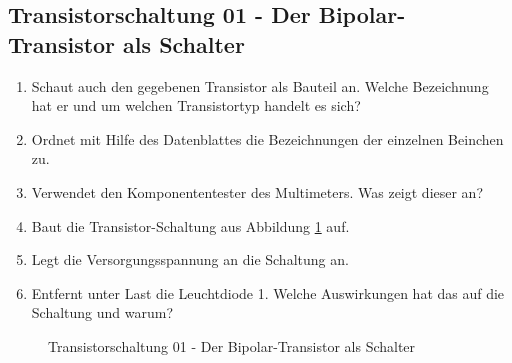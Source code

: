 \subsection*{Transistorschaltung 01 - Der Bipolar-Transistor als Schalter}

\begin{enumerate}
\itemsep1pt\parskip0pt
\item Schaut auch den gegebenen Transistor als Bauteil an. Welche Bezeichnung
  hat er und um welchen Transistortyp handelt es sich? 
\item Ordnet mit Hilfe des Datenblattes die Bezeichnungen der einzelnen Beinchen
  zu. 
\item Verwendet den Komponententester des Multimeters. Was zeigt dieser an?
\item Baut die Transistor-Schaltung aus Abbildung \ref{s01} auf.
\item Legt die Versorgungsspannung an die Schaltung an.
\item Entfernt unter Last die Leuchtdiode 1. Welche Auswirkungen hat das auf die Schaltung und warum?
\end{enumerate}

\begin{figure}[H]
	\centering
	\caption{Transistorschaltung 01 - Der Bipolar-Transistor als Schalter}
	\label{s01}
\end{figure}


